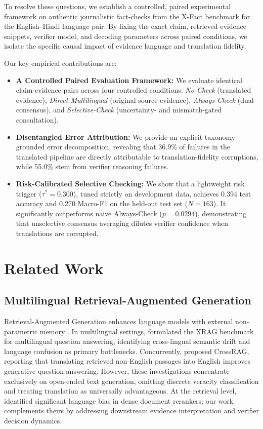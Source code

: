 \documentclass[11pt,a4paper]{article}
\begin{document}
To resolve these questions, we establish a controlled, paired experimental framework on authentic journalistic fact-checks from the X-Fact benchmark \citep{gupta-srikumar-2021-xfact} for the English--Hindi language pair. By fixing the exact claim, retrieved evidence snippets, verifier model, and decoding parameters across paired conditions, we isolate the specific causal impact of evidence language and translation fidelity.

Our key empirical contributions are:
\begin{itemize}
    \item \textbf{A Controlled Paired Evaluation Framework:} We evaluate identical claim-evidence pairs across four controlled conditions: \emph{No-Check} (translated evidence), \emph{Direct Multilingual} (original source evidence), \emph{Always-Check} (dual consensus), and \emph{Selective-Check} (uncertainty- and mismatch-gated consultation).
    \item \textbf{Disentangled Error Attribution:} We provide an explicit taxonomy-grounded error decomposition, revealing that 36.9\% of failures in the translated pipeline are directly attributable to translation-fidelity corruptions, while 55.0\% stem from verifier reasoning failures.
    \item \textbf{Risk-Calibrated Selective Checking:} We show that a lightweight risk trigger ($\tau^*=0.300$), tuned strictly on development data, achieves 0.394 test accuracy and 0.270 Macro-F1 on the held-out test set ($N=163$). It significantly outperforms naive Always-Check ($p = 0.0294$), demonstrating that unselective consensus averaging dilutes verifier confidence when translations are corrupted.
\end{itemize}

\section{Related Work}
\label{sec:related}

\subsection{Multilingual Retrieval-Augmented Generation}
Retrieval-Augmented Generation enhances language models with external non-parametric memory \citep{lewis-etal-2020-rag}. In multilingual settings, \citet{liu-etal-2025-xrag} formulated the XRAG benchmark for multilingual question answering, identifying cross-lingual semantic drift and language confusion as primary bottlenecks. Concurrently, \citet{ranaldi-etal-2026-multilingual} proposed CrossRAG, reporting that translating retrieved non-English passages into English improves generative question answering. However, these investigations concentrate exclusively on open-ended text generation, omitting discrete veracity classification and treating translation as universally advantageous. At the retrieval level, \citet{wang-etal-2026-languages} identified significant language bias in dense document rerankers; our work complements theirs by addressing downstream evidence interpretation and verifier decision dynamics.
\end{document}
